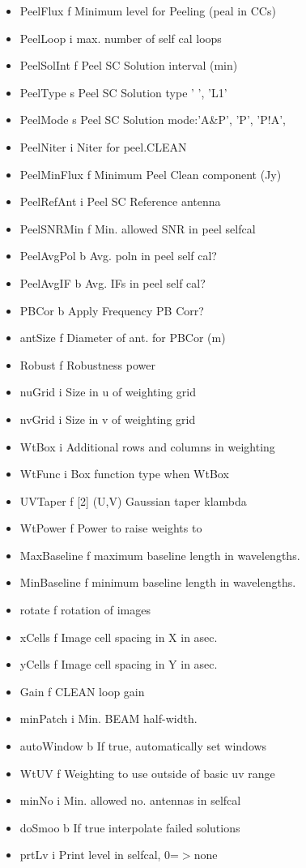 \begin{Desc}
\begin{description}
\begin{itemize}
\item Peel\-Flux f Minimum level for Peeling (peal in CCs) \item Peel\-Loop i max. number of self cal loops \item Peel\-Sol\-Int f Peel SC Solution interval (min) \item Peel\-Type s Peel SC Solution type ' ', 'L1' \item Peel\-Mode s Peel SC Solution mode:'A\&P', 'P', 'P!A', \item Peel\-Niter i Niter for peel.CLEAN \item Peel\-Min\-Flux f Minimum Peel Clean component (Jy) \item Peel\-Ref\-Ant i Peel SC Reference antenna \item Peel\-SNRMin f Min. allowed SNR in peel selfcal \item Peel\-Avg\-Pol b Avg. poln in peel self cal? \item Peel\-Avg\-IF b Avg. IFs in peel self cal? \item PBCor b Apply Frequency PB Corr? \item ant\-Size f Diameter of ant. for PBCor (m) \item Robust f Robustness power \item nu\-Grid i Size in u of weighting grid \item nv\-Grid i Size in v of weighting grid \item Wt\-Box i Additional rows and columns in weighting \item Wt\-Func i Box function type when Wt\-Box \item UVTaper f [2] (U,V) Gaussian taper klambda \item Wt\-Power f Power to raise weights to \item Max\-Baseline f maximum baseline length in wavelengths. \item Min\-Baseline f minimum baseline length in wavelengths. \item rotate f rotation of images \item x\-Cells f Image cell spacing in X in asec. \item y\-Cells f Image cell spacing in Y in asec. \item Gain f CLEAN loop gain \item min\-Patch i Min. BEAM half-width. \item auto\-Window b If true, automatically set windows \item Wt\-UV f Weighting to use outside of basic uv range \item min\-No i Min. allowed no. antennas in selfcal \item do\-Smoo b If true interpolate failed solutions \item prt\-Lv i Print level in selfcal, 0=$>$none \end{itemize}

\end{description}
\end{Desc}
